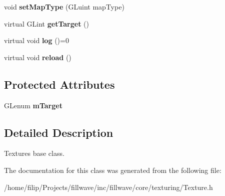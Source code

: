 \begin{DoxyCompactItemize}
\item 
\hypertarget{classfillwave_1_1core_1_1Texture_a848f8e717a0d8060b1976b89a3ff9f24}{}void {\bfseries set\+Map\+Type} (G\+Luint map\+Type)\label{classfillwave_1_1core_1_1Texture_a848f8e717a0d8060b1976b89a3ff9f24}

\item 
\hypertarget{classfillwave_1_1core_1_1Texture_a8fa8a9a98efa44327d4e6401cbeb8b40}{}virtual G\+Lint {\bfseries get\+Target} ()\label{classfillwave_1_1core_1_1Texture_a8fa8a9a98efa44327d4e6401cbeb8b40}

\item 
\hypertarget{classfillwave_1_1core_1_1Texture_aef3e7e55ea7c79a6a0f26d1bfea312a4}{}virtual void {\bfseries log} ()=0\label{classfillwave_1_1core_1_1Texture_aef3e7e55ea7c79a6a0f26d1bfea312a4}

\item 
\hypertarget{classfillwave_1_1core_1_1Texture_a7984315478055ce496f4fa6c09c984a3}{}virtual void {\bfseries reload} ()\label{classfillwave_1_1core_1_1Texture_a7984315478055ce496f4fa6c09c984a3}

\end{DoxyCompactItemize}
\subsection*{Protected Attributes}
\begin{DoxyCompactItemize}
\item 
\hypertarget{classfillwave_1_1core_1_1Texture_abbe57a768f39a7fccdad8259d107422e}{}G\+Lenum {\bfseries m\+Target}\label{classfillwave_1_1core_1_1Texture_abbe57a768f39a7fccdad8259d107422e}

\end{DoxyCompactItemize}


\subsection{Detailed Description}
Textures base class. 

The documentation for this class was generated from the following file\+:\begin{DoxyCompactItemize}
\item 
/home/filip/\+Projects/fillwave/inc/fillwave/core/texturing/Texture.\+h\end{DoxyCompactItemize}
